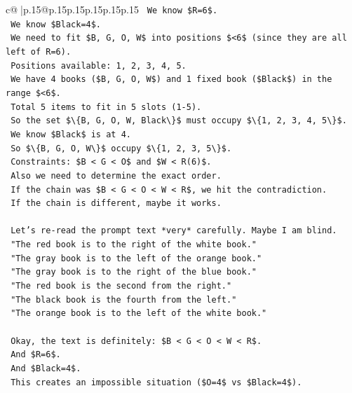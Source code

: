 \documentclass{article}
\begin{document}
{\begin{supertabular}{c@{$\;$}|p{.15\linewidth}@{}p{.15\linewidth}p{.15\linewidth}p{.15\linewidth}p{.15\linewidth}p{.15\linewidth}}
{{{\texttt{    We know \$R=6\$.} \\
\texttt{    We know \$Black=4\$.} \\
\texttt{    We need to fit \$B, G, O, W\$ into positions \$<6\$ (since they are all left of R=6).} \\
\texttt{    Positions available: 1, 2, 3, 4, 5.} \\
\texttt{    We have 4 books (\$B, G, O, W\$) and 1 fixed book (\$Black\$) in the range \$<6\$.} \\
\texttt{    Total 5 items to fit in 5 slots (1{-}5).} \\
\texttt{    So the set \$\textbackslash{}\{B, G, O, W, Black\textbackslash{}\}\$ must occupy \$\textbackslash{}\{1, 2, 3, 4, 5\textbackslash{}\}\$.} \\
\texttt{    We know \$Black\$ is at 4.} \\
\texttt{    So \$\textbackslash{}\{B, G, O, W\textbackslash{}\}\$ occupy \$\textbackslash{}\{1, 2, 3, 5\textbackslash{}\}\$.} \\
\texttt{    Constraints: \$B < G < O\$ and \$W < R(6)\$.} \\
\texttt{    Also we need to determine the exact order.} \\
\texttt{    If the chain was \$B < G < O < W < R\$, we hit the contradiction.} \\
\texttt{    If the chain is different, maybe it works.} \\
\\ 
\texttt{    Let's re{-}read the prompt text *very* carefully. Maybe I am blind.} \\
\texttt{    "The red book is to the right of the white book."} \\
\texttt{    "The gray book is to the left of the orange book."} \\
\texttt{    "The gray book is to the right of the blue book."} \\
\texttt{    "The red book is the second from the right."} \\
\texttt{    "The black book is the fourth from the left."} \\
\texttt{    "The orange book is to the left of the white book."} \\
\\ 
\texttt{    Okay, the text is definitely: \$B < G < O < W < R\$.} \\
\texttt{    And \$R=6\$.} \\
\texttt{    And \$Black=4\$.} \\
\texttt{    This creates an impossible situation (\$O=4\$ vs \$Black=4\$).} \\
}}}
\end{supertabular}}
\end{document}
